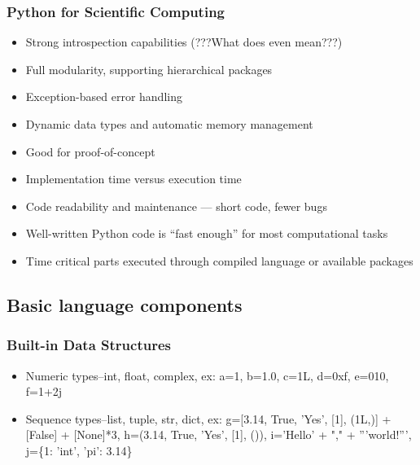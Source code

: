 
\begin{frame}
  \MyLogo
  \frametitle{Python for Scientific Computing}  

\small

\begin{itemize}
	\item Strong introspection capabilities (???What does even mean???)
	\item Full modularity, supporting hierarchical packages
	\item Exception-based error handling
	\item Dynamic data types and automatic memory management
\end{itemize}

\begin{itemize}
	\item Good for proof-of-concept
	\item Implementation time versus execution time
	\item Code readability and maintenance --- short code, fewer bugs
	\item Well-written Python code is ``fast enough'' for most computational tasks
	\item Time critical parts executed through compiled language or \alert{available packages}
\end{itemize}

\end{frame}

\subsection{Basic language components}

\begin{frame}
  \MyLogo
  \frametitle{Built-in Data Structures}  
\small

\begin{itemize}
	\item Numeric types--int, float, complex, ex: a=1, b=1.0, c=1L, d=0xf, e=010, f=1+2j
	\item Sequence types--list, tuple, str, dict, ex: g=[3.14, True, 'Yes', [1], (1L,)] + [False] + [None]*3, h=(3.14, True, 'Yes', [1], ()), i='Hello' + "," + '''world!''', j=\{1: 'int', 'pi': 3.14\}

\end{itemize}

\end{frame}


